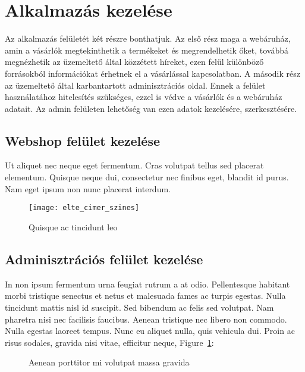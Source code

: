 \section{Alkalmazás kezelése} %
Az alkalmazás felületét két részre bonthatjuk. Az első rész maga a webáruház, amin a vásárlók megtekinthetik a termékeket és megrendelhetik őket, továbbá megnézhetik az üzemeltető által közzétett híreket, ezen felül különböző forrásokból információkat érhetnek el a vásárlással kapcsolatban. A második rész az üzemeltető által karbantartott adminisztrációs oldal. Ennek a felület használatához hitelesítés szükséges, ezzel is védve a vásárlók és a webáruház adatait. Az admin felületen lehetőség van ezen adatok kezelésére, szerkesztésére. 

\subsection{Webshop felület kezelése} %

Ut aliquet nec neque eget fermentum. Cras volutpat tellus sed placerat elementum. Quisque neque dui, consectetur nec finibus eget, blandit id purus. Nam eget ipsum non nunc placerat interdum.

\begin{figure}[H]
	\centering
	\texttt{[image: elte\_cimer\_szines]}
	\caption{Quisque ac tincidunt leo}
\end{figure}

\subsection{Adminisztrációs felület kezelése} %

In non ipsum fermentum urna feugiat rutrum a at odio. Pellentesque habitant morbi tristique senectus et netus et malesuada fames ac turpis egestas. Nulla tincidunt mattis nisl id suscipit. Sed bibendum ac felis sed volutpat. Nam pharetra nisi nec facilisis faucibus. Aenean tristique nec libero non commodo. Nulla egestas laoreet tempus. Nunc eu aliquet nulla, quis vehicula dui. Proin ac risus sodales, gravida nisi vitae, efficitur neque, Figure~\ref{fig:example-2}:

\begin{figure}[H]
	\centering
	\hspace{5pt}
	\caption{Aenean porttitor mi volutpat massa gravida}
	\label{fig:example-2}
\end{figure}

